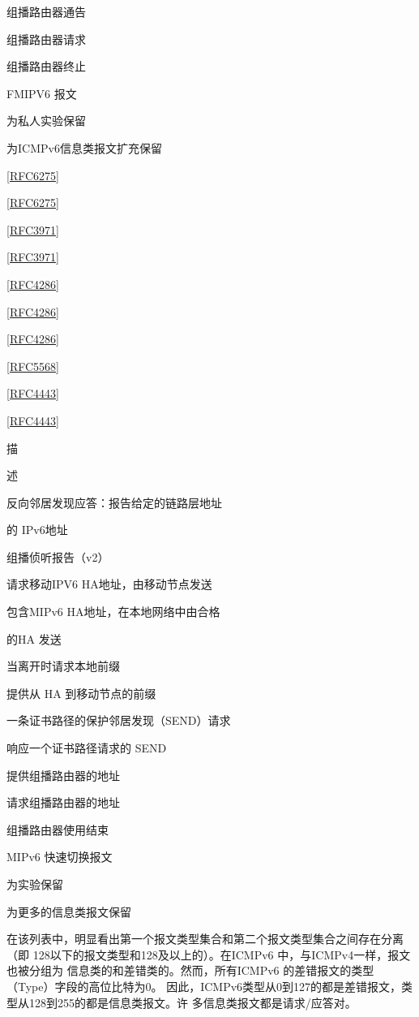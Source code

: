 组播路由器通告

组播路由器请求

组播路由器终止

FMIPV6 报文

为私人实验保留

为ICMPv6信息类报文扩充保留

\href{https://www.rfc-editor.org/rfc/rfc6275}{[RFC6275]}

\href{https://www.rfc-editor.org/rfc/rfc6275}{[RFC6275]}

\href{https://www.rfc-editor.org/rfc/rfc3971}{[RFC3971]}

\href{https://www.rfc-editor.org/rfc/rfc3971}{[RFC3971]}

\href{https://www.rfc-editor.org/rfc/rfc4286}{[RFC4286]}

\href{https://www.rfc-editor.org/rfc/rfc4286}{[RFC4286]}

\href{https://www.rfc-editor.org/rfc/rfc4286}{[RFC4286]}

\href{https://www.rfc-editor.org/rfc/rfc5568}{[RFC5568]}

\href{https://www.rfc-editor.org/rfc/rfc4443}{[RFC4443]}

\href{https://www.rfc-editor.org/rfc/rfc4443}{[RFC4443]}

描

述

反向邻居发现应答：报告给定的链路层地址

的 IPv6地址

组播侦听报告（v2）

请求移动IPV6 HA地址，由移动节点发送

包含MIPv6 HA地址，在本地网络中由合格

的HA 发送

当离开时请求本地前缀

提供从 HA 到移动节点的前缀

一条证书路径的保护邻居发现（SEND）请求

响应一个证书路径请求的 SEND

提供组播路由器的地址

请求组播路由器的地址

组播路由器使用结束

MIPv6 快速切换报文

为实验保留

为更多的信息类报文保留

在该列表中，明显看出第一个报文类型集合和第二个报文类型集合之间存在分离（即
128以下的报文类型和128及以上的）。在ICMPv6 中，与ICMPv4一样，报文也被分组为
信息类的和差错类的。然而，所有ICMPv6 的差错报文的类型（Type）字段的高位比特为0。
因此，ICMPv6类型从0到127的都是差错报文，类型从128到255的都是信息类报文。许
多信息类报文都是请求/应答对。

